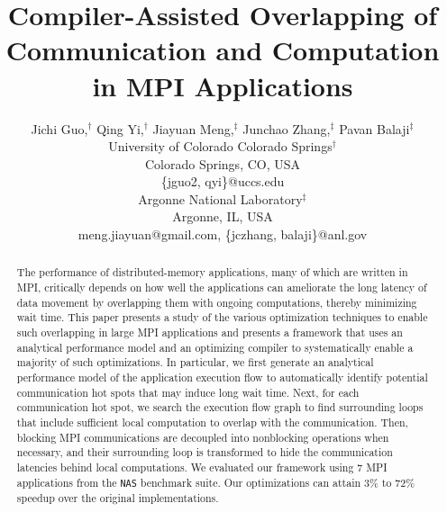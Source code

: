 \documentclass[10pt,doublecolumn,conference]{IEEEtran}
\begin{document}
%
%
\title{Compiler-Assisted Overlapping of Communication and Computation in MPI Applications}

\author{Jichi Guo,$^\dag$ Qing Yi,$^\dag$ Jiayuan Meng,$^\ddag$ Junchao Zhang,$^\ddag$ Pavan Balaji$^\ddag$\\
University of Colorado Colorado Springs$^\dag$\\
Colorado Springs, CO, USA\\
\{jguo2, qyi\}@uccs.edu \\
Argonne National Laboratory$^\ddag$\\
Argonne, IL, USA\\
meng.jiayuan@gmail.com, \{jczhang, balaji\}@anl.gov
}

\maketitle

\begin{abstract}
The performance of distributed-memory applications, many of which are
written in MPI, critically depends on how well the applications can
ameliorate the long latency of data movement by overlapping
them with ongoing computations, thereby minimizing wait time.  This
paper presents a study of the various optimization techniques to
enable such overlapping in large MPI applications and presents a
framework that uses an analytical performance model and an optimizing compiler
to systematically enable a majority of such optimizations.  In particular, we first generate an
analytical performance model of the application execution flow to automatically identify potential communication hot spots
that may induce long wait time.  Next, for each communication hot
spot, we search the execution flow graph to find surrounding loops that
include sufficient local computation to overlap with the
communication.  Then, blocking MPI communications are decoupled into
nonblocking operations when necessary, and their surrounding loop is
transformed to hide the communication latencies behind local
computations.  We evaluated our framework using 7 MPI applications
from the \texttt{NAS} benchmark suite.  Our optimizations can attain
3\% to 72\% speedup over the original implementations.
\end{abstract}


\end{document}
